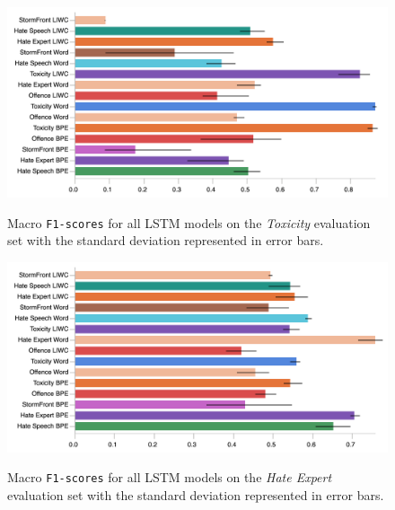 \begin{figure}
\begin{minipage}{\textwidth}
    \centering
    \includegraphics[width=\textwidth]{all_lstm_wulczyn_test.pdf}
    \caption{Macro \texttt{F1-scores} for all LSTM models on the \textit{Toxicity} evaluation set with the standard deviation represented in error bars.}
    \label{fig:wulczyn_lstm_test}
  \vfill
    \includegraphics[width=\textwidth]{all_lstm_waseem_test.pdf}
    \caption{Macro \texttt{F1-scores} for all LSTM models on the \textit{Hate Expert} evaluation set with the standard deviation represented in error bars.}
    \label{fig:waseem_lstm_test}
\end{minipage}
\end{figure}

